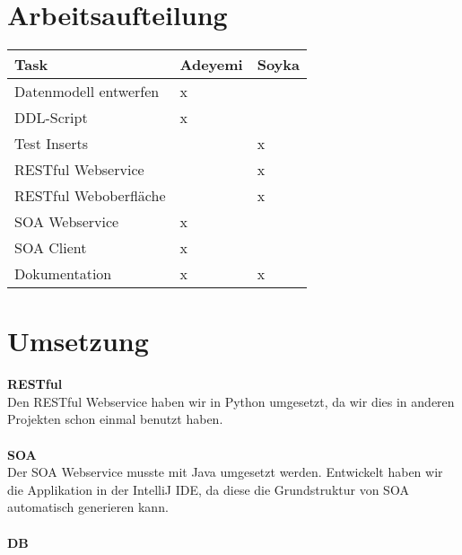 \documentclass[11pt]{article}
\begin{document}
\section{Arbeitsaufteilung}
\begin{center}
  \begin{tabular}{| l | l | l |}
        \hline
		Task & Adeyemi & Soyka  \\ \hline \hline
    	Datenmodell entwerfen & x & \\ \hline
		DDL-Script & x & \\ \hline
    	Test Inserts  &  & x\\ \hline 
		RESTful Webservice &  & x\\ \hline 
    	RESTful Weboberfläche &  & x\\ \hline 
    	SOA Webservice & x & \\ \hline
		SOA Client & x & \\ \hline
		Dokumentation & x & x\\ \hline

  \end{tabular}
\end{center}

\section{Umsetzung}
\textbf{RESTful}\\
Den RESTful Webservice haben wir in Python umgesetzt, da wir dies in anderen Projekten schon einmal benutzt haben.\\
\\
\textbf{SOA}\\
Der SOA Webservice musste mit Java umgesetzt werden. Entwickelt haben wir die Applikation in der IntelliJ IDE, da diese die Grundstruktur von SOA automatisch generieren kann.\\
\\
\textbf{DB}
\end{document}
